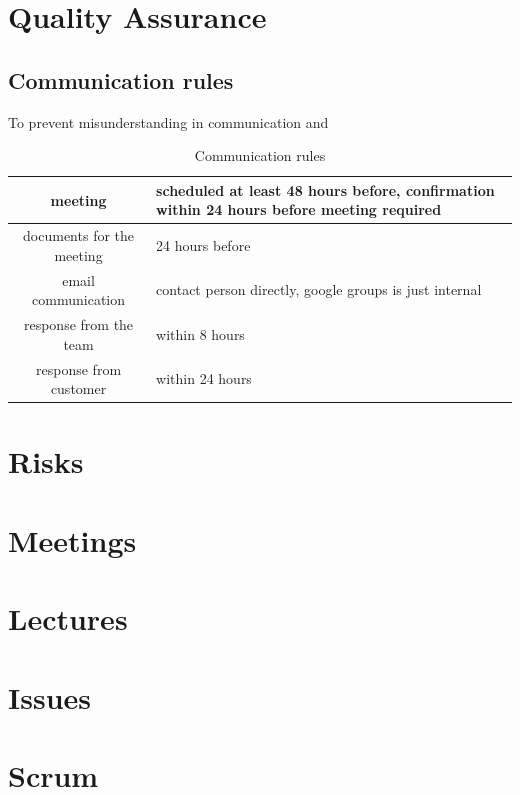 \section{Quality Assurance}
\subsection{Communication rules}
To prevent misunderstanding in communication and

\begin{table}
\begin{tabularx}{\textwidth}{ | c | X | }
  \hline
  meeting & scheduled at least 48 hours before, confirmation within 24 hours before meeting required \\ \hline
  documents for the meeting & 24 hours before \\ \hline
  email communication & contact person directly, google groups is just internal \\ \hline
  response from the team & within 8 hours \\ \hline
  response from customer & within 24 hours \\ \hline
\end{tabularx}
\caption{Communication rules}
\end{table}

\section{Risks}


\section{Meetings}
\section{Lectures}
\section{Issues}
\section{Scrum}


